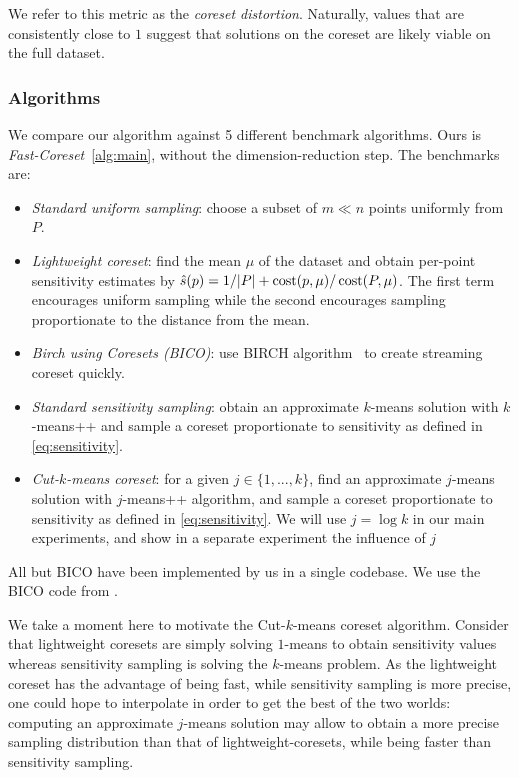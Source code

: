 We refer to this metric as the \emph{coreset distortion}. Naturally, values that are consistently close to $1$ suggest that solutions on the coreset are likely
viable on the full dataset.


\subsubsection{Algorithms}
We compare our algorithm against 5 different benchmark algorithms. Ours is \emph{Fast-Coreset}~\ref{alg:main}, without the dimension-reduction step. The benchmarks are:
\begin{itemize}
        \item \emph{Standard uniform sampling}: choose a subset of $m \ll n$ points uniformly from $P$.
        \item \emph{Lightweight coreset}: find the mean $\mu$ of the dataset and obtain per-point sensitivity estimates by $\hat{s}(p) = 1/|P| + \operatorname{cost}(p, \mu) / \operatorname{cost}(P, \mu)$.
            The first term encourages uniform sampling while the second encourages sampling proportionate to the distance from the mean.
        \item \emph{Birch using Coresets (BICO)}: use BIRCH algorithm~\cite{birch} to create streaming coreset quickly. 
        \item \emph{Standard sensitivity sampling}: obtain an approximate $k$-means solution with $k$-means++ and sample a coreset proportionate to sensitivity as defined in \cref{eq:sensitivity}.
        \item \emph{Cut-$k$-means coreset}: for a given $j \in \{1,..., k\}$, find an approximate $j$-means solution with $j$-means++ algorithm, and sample a coreset proportionate to sensitivity as defined in \cref{eq:sensitivity}. We will use $j = \log k$ in our main experiments, and show in a separate experiment the influence of $j$ 
\end{itemize}
All but BICO have been implemented by us in a single codebase. We use the BICO code from \cite{} .

We take a moment here to motivate the Cut-$k$-means coreset algorithm.  Consider that lightweight coresets are simply solving $1$-means to obtain sensitivity
values whereas sensitivity sampling is solving the $k$-means problem.  As the lightweight coreset has the advantage of being fast, while sensitivity sampling is
more precise, one could hope to interpolate in order to get the best of the two worlds: computing an approximate $j$-means solution may allow to obtain a more
precise sampling distribution than that of lightweight-coresets, while being faster than sensitivity sampling.

